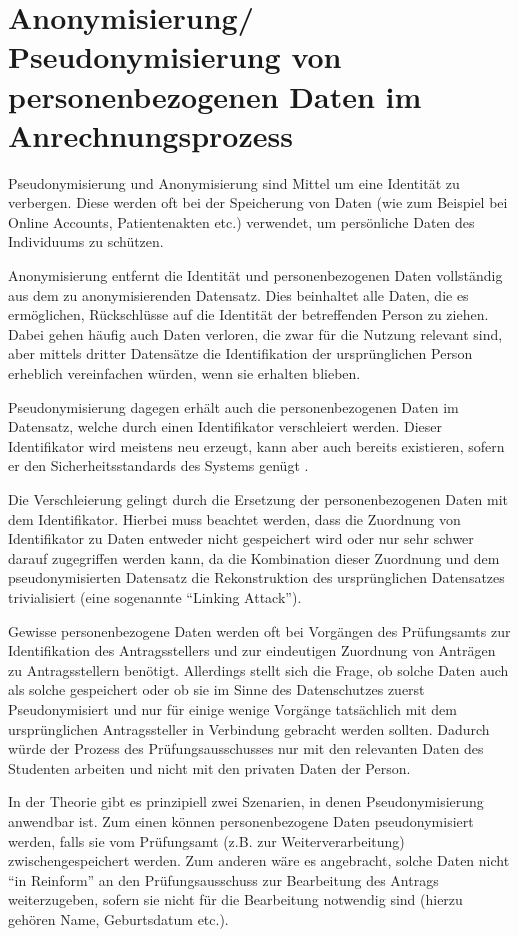 \chapter{Anonymisierung/ Pseudonymisierung von personenbezogenen Daten im Anrechnungsprozess}

Pseudonymisierung und Anonymisierung sind Mittel um eine Identität zu verbergen. 
Diese werden oft bei der Speicherung von Daten (wie zum Beispiel bei Online Accounts, Patientenakten etc.) verwendet, um persönliche Daten des Individuums zu schützen. 

Anonymisierung entfernt die Identität und personenbezogenen Daten vollständig aus dem zu anonymisierenden Datensatz. Dies beinhaltet alle Daten, die es ermöglichen, Rückschlüsse auf die Identität der betreffenden Person zu ziehen. Dabei gehen häufig auch Daten verloren, die zwar für die Nutzung relevant sind, aber mittels dritter Datensätze die Identifikation der ursprünglichen Person erheblich vereinfachen würden, wenn sie erhalten blieben.

Pseudonymisierung dagegen erhält auch die personenbezogenen Daten im Datensatz, welche durch einen Identifikator verschleiert werden. Dieser Identifikator wird meistens neu erzeugt, kann aber auch bereits existieren, sofern er den Sicherheitsstandards des Systems genügt \parencite{pseudonym}.

Die Verschleierung gelingt durch die Ersetzung der personenbezogenen Daten mit dem Identifikator. Hierbei muss beachtet werden, dass die Zuordnung von Identifikator zu Daten entweder nicht gespeichert wird oder nur sehr schwer darauf zugegriffen werden kann, da die Kombination dieser Zuordnung und dem pseudonymisierten Datensatz die Rekonstruktion des ursprünglichen Datensatzes trivialisiert (eine sogenannte “Linking Attack”). 

Gewisse personenbezogene Daten werden oft bei Vorgängen des Prüfungsamts zur Identifikation des Antragsstellers und zur eindeutigen Zuordnung von Anträgen zu Antragsstellern benötigt. Allerdings stellt sich die Frage, ob solche Daten auch als solche gespeichert oder ob sie im Sinne des Datenschutzes zuerst Pseudonymisiert und nur für einige wenige Vorgänge tatsächlich mit dem ursprünglichen Antragssteller in Verbindung gebracht werden sollten. Dadurch würde der Prozess des Prüfungsausschusses  nur mit den relevanten Daten des Studenten arbeiten und nicht mit den privaten Daten der Person. 

In der Theorie gibt es prinzipiell zwei Szenarien, in denen Pseudonymisierung anwendbar ist. Zum einen können personenbezogene Daten pseudonymisiert werden, falls sie vom Prüfungsamt (z.B. zur Weiterverarbeitung) zwischengespeichert werden. Zum anderen wäre es angebracht, solche Daten nicht “in Reinform” an den Prüfungsausschuss zur Bearbeitung des Antrags weiterzugeben, sofern sie nicht für die Bearbeitung notwendig sind (hierzu gehören Name, Geburtsdatum etc.).

